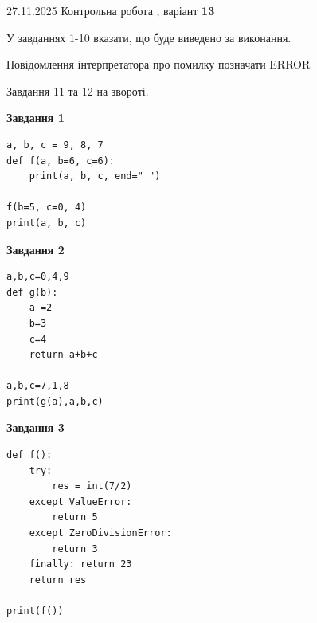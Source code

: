 \documentclass[12pt, ukrainian]{article}
\begin{document}
{{{{{{{{{{{{{{ 27.11.2025 Контрольна робота , варіант  \No \textbf { 13 }\par}}
{

{%



У завданнях 1-10 вказати, що буде виведено за виконання.

Повідомлення інтерпретатора про помилку позначати ERROR

Завдання 11 та 12 на звороті.

\begin{minipage}[t]{7.5cm}

\begin{center}
\textbf{Завдання 1}
\end{center}

\begin{verbatim}
a, b, c = 9, 8, 7
def f(a, b=6, c=6):
    print(a, b, c, end=" ")

f(b=5, c=0, 4)
print(a, b, c)
\end{verbatim}



\begin{center}
\textbf{Завдання 2}
\end{center}

\begin{verbatim}
a,b,c=0,4,9
def g(b):
    a-=2
    b=3
    c=4
    return a+b+c

a,b,c=7,1,8
print(g(a),a,b,c)
\end{verbatim}



\begin{center}
\textbf{Завдання 3}
\end{center}

\begin{verbatim}
def f():
    try:
        res = int(7/2)
    except ValueError: 
        return 5
    except ZeroDivisionError: 
        return 3
    finally: return 23
    return res

print(f())
\end{verbatim}




\end{minipage}}}}}}}}}}}}}}}
\end{document}
